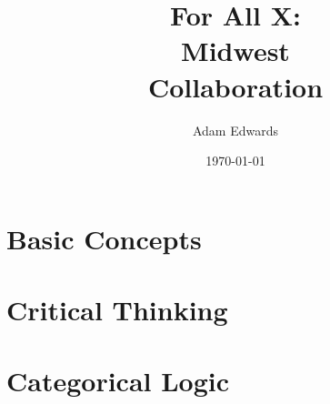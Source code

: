 \documentclass[nobib]{tufte-book}
\title{For All X: \\ Midwest \\ Collaboration}
\author[Adam Edwards]{Adam Edwards}
\date{\today}
\begin{document}

\frontmatter

\pagestyle{empty}
\setlength{\parindent}{0pt}
\setlength{\parskip}{\baselineskip}


\maketitle




\setlength{\parskip}{0em}

\begin{fullwidth}
\tableofcontents
\end{fullwidth}






\mainmatter

\label{full_version}
\listoffigures
\newpage
\listoftables

\part{Basic Concepts}\label{part:basic_concepts}




\part{Critical Thinking}\label{part:critical_thinking}


%
%
%
%
%
%
%

\part{Categorical Logic}\label{part:cat_logic}


%
%
%
\end{document}
